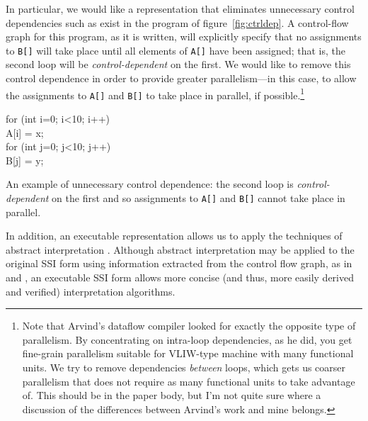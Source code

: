 \documentclass[12pt,titlepage]{article}
\begin{document}
In particular, we would like a representation that eliminates
unnecessary control dependencies such as exist in the program of
figure~\vref{fig:ctrldep}.  A control-flow graph for this program, as
it is written, will explicitly specify that no assignments to
\texttt{B[]} will take place until all elements of \texttt{A[]} have
been assigned; that is, the second loop will be
\emph{control-dependent} on the first.  We would like to remove this
control dependence in order to provide greater parallelism---in this
case, to allow the assignments to \texttt{A[]} and \texttt{B[]} to
take place in parallel, if possible.\footnote{Note that Arvind's
dataflow compiler \cite{traub86:ttda} looked for exactly the opposite type of
parallelism.  By concentrating on intra-loop dependencies, as he did, you get
fine-grain parallelism suitable for VLIW-type machine with many
functional units.  We try to remove dependencies \emph{between} loops,
which gets us coarser parallelism that does not require as many
functional units to take advantage of.  This should be in the paper
body, but I'm not quite sure where a discussion of the differences
between Arvind's work and mine belongs.}

\begin{myfigure}[t]
\begin{samplecode}
for (int i=0; i<10; i++)\\
\>A[i] = x;\\
for (int j=0; j<10; j++)\\
\>B[j] = y;\\
\end{samplecode}
\caption{An example of unnecessary control dependence: the second loop
is \emph{control-dependent} on the first and so assignments to
\texttt{A[]} and \texttt{B[]} cannot take place in parallel.}
\label{fig:ctrldep}
\end{myfigure}

In addition, an executable representation allows us to apply the
techniques of abstract interpretation \cite{idunno}.  Although abstract
interpretation may be applied to the original SSI form using
information extracted from the control flow graph, as in \cite{foo}
and \cite{bar}, an executable SSI form allows more concise (and thus,
more easily derived and verified) interpretation
algorithms.
\end{document}
